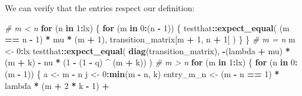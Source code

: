 \documentclass[]{article}
\newenvironment{Shaded}{\begin{snugshade}}{\end{snugshade}}
\newcommand{\CommentTok}[1]{\textcolor[rgb]{0.56,0.35,0.01}{\textit{#1}}}
\newcommand{\ControlFlowTok}[1]{\textcolor[rgb]{0.13,0.29,0.53}{\textbf{#1}}}
\newcommand{\DecValTok}[1]{\textcolor[rgb]{0.00,0.00,0.81}{#1}}
\newcommand{\KeywordTok}[1]{\textcolor[rgb]{0.13,0.29,0.53}{\textbf{#1}}}
\newcommand{\NormalTok}[1]{#1}
\newcommand{\OperatorTok}[1]{\textcolor[rgb]{0.81,0.36,0.00}{\textbf{#1}}}
\newcommand{\StringTok}[1]{\textcolor[rgb]{0.31,0.60,0.02}{#1}}
\begin{document}
We can verify that the entries respect our definition:

\begin{Shaded}
\begin{Highlighting}[]
\CommentTok{# m < n}
\ControlFlowTok{for}\NormalTok{ (n }\ControlFlowTok{in} \DecValTok{1}\OperatorTok{:}\NormalTok{lx) \{}
  \ControlFlowTok{for}\NormalTok{ (m }\ControlFlowTok{in} \DecValTok{0}\OperatorTok{:}\NormalTok{(n }\OperatorTok{-}\StringTok{ }\DecValTok{1}\NormalTok{)) \{}
\NormalTok{    testthat}\OperatorTok{::}\KeywordTok{expect_equal}\NormalTok{(}
\NormalTok{      (m }\OperatorTok{==}\StringTok{ }\NormalTok{n }\OperatorTok{-}\StringTok{ }\DecValTok{1}\NormalTok{) }\OperatorTok{*}\StringTok{ }\NormalTok{mu }\OperatorTok{*}\StringTok{ }\NormalTok{(m }\OperatorTok{+}\StringTok{ }\DecValTok{1}\NormalTok{),}
\NormalTok{      transition_matrix[m }\OperatorTok{+}\StringTok{ }\DecValTok{1}\NormalTok{, n }\OperatorTok{+}\StringTok{ }\DecValTok{1}\NormalTok{]}
\NormalTok{    )}
\NormalTok{  \}}
\NormalTok{\}}
\CommentTok{# m = n}
\NormalTok{m <-}\StringTok{ }\DecValTok{0}\OperatorTok{:}\NormalTok{lx}
\NormalTok{testthat}\OperatorTok{::}\KeywordTok{expect_equal}\NormalTok{(}
  \KeywordTok{diag}\NormalTok{(transition_matrix),}
  \OperatorTok{-}\NormalTok{(lambda }\OperatorTok{+}\StringTok{ }\NormalTok{mu) }\OperatorTok{*}\StringTok{ }\NormalTok{(m }\OperatorTok{+}\StringTok{ }\NormalTok{k) }\OperatorTok{-}\StringTok{ }\NormalTok{nu }\OperatorTok{*}\StringTok{ }\NormalTok{(}\DecValTok{1} \OperatorTok{-}\StringTok{ }\NormalTok{(}\DecValTok{1} \OperatorTok{-}\StringTok{ }\NormalTok{q) }\OperatorTok{^}\StringTok{ }\NormalTok{(m }\OperatorTok{+}\StringTok{ }\NormalTok{k))}
\NormalTok{)}
\CommentTok{# m > n}
\ControlFlowTok{for}\NormalTok{ (m }\ControlFlowTok{in} \DecValTok{1}\OperatorTok{:}\NormalTok{lx) \{}
  \ControlFlowTok{for}\NormalTok{ (n }\ControlFlowTok{in} \DecValTok{0}\OperatorTok{:}\NormalTok{(m }\OperatorTok{-}\StringTok{ }\DecValTok{1}\NormalTok{)) \{}
\NormalTok{    a <-}\StringTok{ }\NormalTok{m }\OperatorTok{-}\StringTok{ }\NormalTok{n}
\NormalTok{    j <-}\StringTok{ }\DecValTok{0}\OperatorTok{:}\KeywordTok{min}\NormalTok{(m }\OperatorTok{-}\StringTok{ }\NormalTok{n, k)}
\NormalTok{    entry_m_n <-}\StringTok{ }
\StringTok{      }\NormalTok{(m }\OperatorTok{-}\StringTok{ }\NormalTok{n }\OperatorTok{==}\StringTok{ }\DecValTok{1}\NormalTok{) }\OperatorTok{*}\StringTok{ }\NormalTok{lambda }\OperatorTok{*}\StringTok{ }\NormalTok{(m }\OperatorTok{+}\StringTok{ }\DecValTok{2} \OperatorTok{*}\StringTok{ }\NormalTok{k }\OperatorTok{-}\StringTok{ }\DecValTok{1}\NormalTok{) }\OperatorTok{+}

\end{Highlighting}
\end{Shaded}
\end{document}
